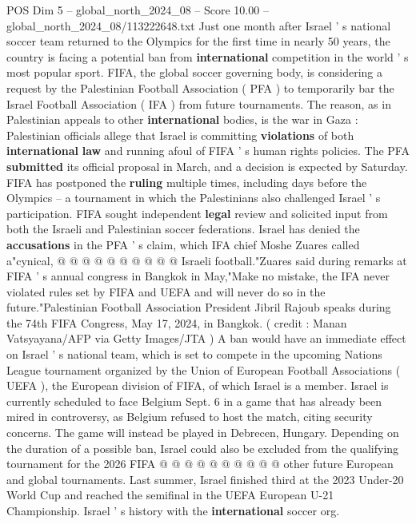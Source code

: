 \begin{textsample}{POS Dim 5 – global\_north\_2024\_08 – Score 10.00 – global\_north\_2024\_08/113222648.txt}  \label{ex:f5_pos_397}
Just one month after Israel ' s national soccer team returned to the Olympics for the first time in nearly 50 years, the country is facing a potential ban from \textbf{international} competition in the world ' s most popular sport.
FIFA, the global soccer governing body, is considering a request by the Palestinian Football Association ( PFA ) to temporarily bar the Israel Football Association ( IFA ) from future tournaments.
The reason, as in Palestinian appeals to other \textbf{international} bodies, is the war in Gaza : Palestinian officials allege that Israel is committing \textbf{violations} of both \textbf{international} \textbf{law} and running afoul of FIFA ' s human rights policies.
The PFA \textbf{submitted} its official proposal in March, and a decision is expected by Saturday.
FIFA has postponed the \textbf{ruling} multiple times, including days before the Olympics -- a tournament in which the Palestinians also challenged Israel ' s participation.
FIFA sought independent \textbf{legal} review and solicited input from both the Israeli and Palestinian soccer federations.
Israel has denied the \textbf{accusations} in the PFA ' s claim, which IFA chief Moshe Zuares called a"cynical, @ @ @ @ @ @ @ @ @ @ Israeli football."Zuares said during remarks at FIFA ' s annual congress in Bangkok in May,"Make no mistake, the IFA never violated rules set by FIFA and UEFA and will never do so in the future."Palestinian Football Association President Jibril Rajoub speaks during the 74th FIFA Congress, May 17, 2024, in Bangkok. ( credit : Manan Vatsyayana/AFP via Getty Images/JTA ) A ban would have an immediate effect on Israel ' s national team, which is set to compete in the upcoming Nations League tournament organized by the Union of European Football Associations ( UEFA ), the European division of FIFA, of which Israel is a member.
Israel is currently scheduled to face Belgium Sept. 6 in a game that has already been mired in controversy, as Belgium refused to host the match, citing security concerns.
The game will instead be played in Debrecen, Hungary.
Depending on the duration of a possible ban, Israel could also be excluded from the qualifying tournament for the 2026 FIFA @ @ @ @ @ @ @ @ @ @ other future European and global tournaments.
Last summer, Israel finished third at the 2023 Under-20 World Cup and reached the semifinal in the UEFA European U-21 Championship.
Israel ' s history with the \textbf{international} soccer org.

\end{textsample}
